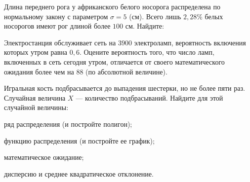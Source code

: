 \vfil

\begin{zkrPlain}{25}\noindent 
	Длина переднего рога у африканского белого носорога распределена по нормальному закону с параметром $\sigma = 5$ (см). Всего лишь $2{,}28\%$ белых носорогов имеют рог длиной более $100$ см. Найдите: \par {}
 
\end{zkrPlain}

\vfil

\begin{zkrPlain}{25}\noindent 
	Электростанция обслуживает сеть на $ 3900 $ электроламп, вероятность включения которых утром равна $ 0{,}6 $. Оцените вероятность того, что число ламп, включенных в сеть сегодня утром, отличается от своего математического ожидания более чем на $ 88 $ (по абсолютной величине). 
 
\end{zkrPlain}

\newpage\setcounter{zad}{0}\setcounter{footnote}{0}



\begin{zkrPlain}{25}\noindent 
	Игральная кость подбрасывается до выпадения шестерки, но не более пяти раз. Случайная величина $X$ --- количество подбрасываний.  Найдите для этой случайной величины: \par \smallskip\small{ \par \zz ряд распределения (и постройте полигон); \par \zz функцию распределения (и постройте ее график); \par \zz математическое ожидание; \par \zz дисперсию и среднее квадратическое отклонение.\par \par}
 
\end{zkrPlain}

\vfil


